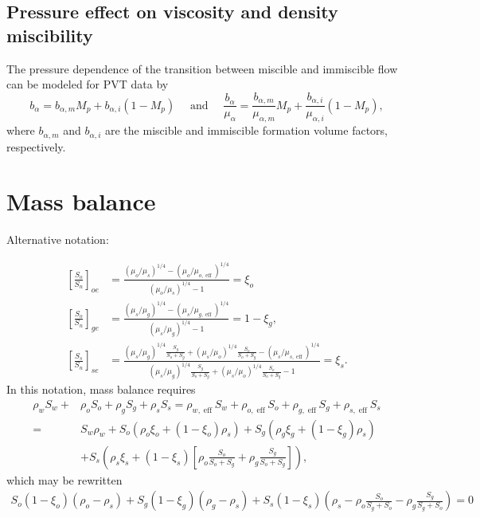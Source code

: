 \documentclass[11pt, a4paper]{article}
\DeclareMathOperator{\eff}{eff}
\begin{document}
\subsection*{Pressure effect on viscosity and density miscibility}

The pressure dependence of the transition between miscible and immiscible flow can be modeled for
PVT data by
\begin{equation*}
  b_\alpha = b_{\alpha,m} M_p + b_{\alpha,i}(1-M_p) \quad  \text{ and } \quad
  \frac{b_\alpha}{\mu_\alpha} = \frac{b_{\alpha,m}}{\mu_{\alpha,m}} M_p + \frac{b_{\alpha,i}}{\mu_{\alpha,i}}(1-M_p),
\end{equation*}
where $b_{\alpha,m}$ and $b_{\alpha,i}$ are the miscible and immiscible formation volume factors,
respectively. 


\section{Mass balance}

Alternative notation:

\begin{align*}
  \left[\frac{S_o}{S_n}\right]_{oe} & = \frac{(\mu_o/\mu_s)^{1/4} - (\mu_o/\mu_{o,\eff})^{1/4}}{(\mu_o/\mu_s)^{1/4} - 1} = \xi_o \\
  \left[\frac{S_o}{S_n}\right]_{ge} & = \frac{(\mu_s/\mu_g)^{1/4} - (\mu_s/\mu_{g,\eff})^{1/4}}{(\mu_s/\mu_g)^{1/4} - 1} = 1-\xi_g, \\
  \left[\frac{S_s}{S_n}\right]_{se} &= \frac{(\mu_s/\mu_g)^{1/4}\frac{S_g}{S_o + S_g} + (\mu_s/\mu_o)^{1/4}\frac{S_o}{S_o + S_g} - (\mu_s/\mu_{s,\eff})^{1/4}}
{(\mu_s/\mu_g)^{1/4}\frac{S_g}{S_o + S_g} + (\mu_s/\mu_o)^{1/4}\frac{S_o}{S_o + S_g} - 1} = \xi_s.
\end{align*}
In this notation, mass balance requires
\begin{align*}
  \rho_w S_w +& \rho_o S_o + \rho_g S_g + \rho_s S_s = \rho_{w, \eff} S_w + \rho_{o, \eff} S_o + \rho_{g, \eff} S_g + \rho_{s, \eff} S_s \\
             = & S_w \rho_w + S_o \left(\rho_o \xi_o + (1-\xi_o)\rho_s\right)
               + S_g \left(\rho_g \xi_g + (1-\xi_g)\rho_s\right) \\
             & + S_s \left(\rho_s \xi_s + (1-\xi_s)\left[\rho_o \frac{S_o}{S_o + S_g} + \rho_g \frac{S_g}{S_o + S_g}\right]\right),
\end{align*}
which may be rewritten
\begin{align*}
  S_o(1-\xi_o)(\rho_o - \rho_s) + S_g(1-\xi_g)(\rho_g - \rho_s) +
  S_s(1-\xi_s)\left(\rho_s - \rho_o \frac{S_o}{S_g + S_o} - \rho_g \frac{S_g}{S_g + S_o}\right) = 0
\end{align*}
 
\end{document}
